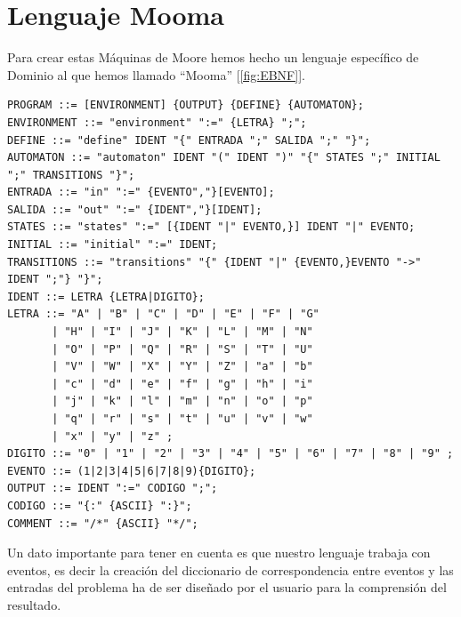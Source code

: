 \documentclass{pre-tfg}
\begin{document}
\section{Lenguaje Mooma}
Para crear estas Máquinas de Moore hemos hecho un lenguaje específico de Dominio al que hemos llamado ``Mooma'' [\ref{fig:EBNF}].

\begin{lstlisting}[caption=EBNF de nuestro lenguaje de definición de Máquinas de Moore (Mooma)., label=fig:EBNF]
PROGRAM ::= [ENVIRONMENT] {OUTPUT} {DEFINE} {AUTOMATON};
ENVIRONMENT ::= "environment" ":=" {LETRA} ";";
DEFINE ::= "define" IDENT "{" ENTRADA ";" SALIDA ";" "}";
AUTOMATON ::= "automaton" IDENT "(" IDENT ")" "{" STATES ";" INITIAL ";" TRANSITIONS "}";
ENTRADA ::= "in" ":=" {EVENTO","}[EVENTO];
SALIDA ::= "out" ":=" {IDENT","}[IDENT];
STATES ::= "states" ":=" [{IDENT "|" EVENTO,}] IDENT "|" EVENTO;
INITIAL ::= "initial" ":=" IDENT;
TRANSITIONS ::= "transitions" "{" {IDENT "|" {EVENTO,}EVENTO "->" IDENT ";"} "}";
IDENT ::= LETRA {LETRA|DIGITO};
LETRA ::= "A" | "B" | "C" | "D" | "E" | "F" | "G"
       | "H" | "I" | "J" | "K" | "L" | "M" | "N"
       | "O" | "P" | "Q" | "R" | "S" | "T" | "U"
       | "V" | "W" | "X" | "Y" | "Z" | "a" | "b"
       | "c" | "d" | "e" | "f" | "g" | "h" | "i"
       | "j" | "k" | "l" | "m" | "n" | "o" | "p"
       | "q" | "r" | "s" | "t" | "u" | "v" | "w"
       | "x" | "y" | "z" ;
DIGITO ::= "0" | "1" | "2" | "3" | "4" | "5" | "6" | "7" | "8" | "9" ;
EVENTO ::= (1|2|3|4|5|6|7|8|9){DIGITO};
OUTPUT ::= IDENT ":=" CODIGO ";";
CODIGO ::= "{:" {ASCII} ":}";
COMMENT ::= "/*" {ASCII} "*/";

\end{lstlisting}
Un dato importante para tener en cuenta es que nuestro lenguaje trabaja con eventos, es decir la creación del diccionario de correspondencia entre eventos y las entradas del problema ha de ser diseñado por el usuario para la comprensión del resultado.
\end{document}
